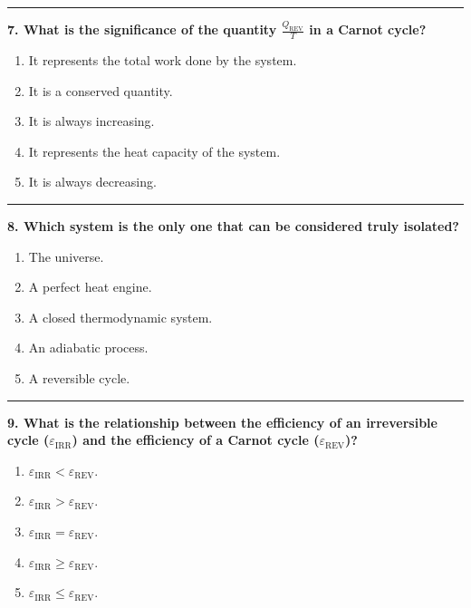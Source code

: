\documentclass[
  9pt,
]{extbook}
\providecommand{\tightlist}{%
  \setlength{\itemsep}{0pt}\setlength{\parskip}{0pt}}
\theoremstyle{definition}
\theoremstyle{definition}
\theoremstyle{definition}
\theoremstyle{remark}
\begin{document}
\begin{center}\rule{0.5\linewidth}{0.5pt}\end{center}

\textbf{7. What is the significance of the quantity \(\frac{Q_{\text{REV}}}{T}\) in a Carnot cycle?}

\begin{enumerate}
\def\labelenumi{\alph{enumi}.}
\tightlist
\item
  It represents the total work done by the system.
\item
  It is a conserved quantity.
\item
  It is always increasing.
\item
  It represents the heat capacity of the system.
\item
  It is always decreasing.
\end{enumerate}

\begin{center}\rule{0.5\linewidth}{0.5pt}\end{center}

\textbf{8. Which system is the only one that can be considered truly isolated?}

\begin{enumerate}
\def\labelenumi{\alph{enumi}.}
\tightlist
\item
  The universe.
\item
  A perfect heat engine.
\item
  A closed thermodynamic system.
\item
  An adiabatic process.
\item
  A reversible cycle.
\end{enumerate}

\begin{center}\rule{0.5\linewidth}{0.5pt}\end{center}

\textbf{9. What is the relationship between the efficiency of an irreversible cycle (\(\varepsilon_{\text{IRR}}\)) and the efficiency of a Carnot cycle (\(\varepsilon_{\text{REV}}\))?}

\begin{enumerate}
\def\labelenumi{\alph{enumi}.}
\tightlist
\item
  \(\varepsilon_{\text{IRR}} < \varepsilon_{\text{REV}}\).
\item
  \(\varepsilon_{\text{IRR}} > \varepsilon_{\text{REV}}\).
\item
  \(\varepsilon_{\text{IRR}} = \varepsilon_{\text{REV}}\).
\item
  \(\varepsilon_{\text{IRR}} \geq \varepsilon_{\text{REV}}\).
\item
  \(\varepsilon_{\text{IRR}} \leq \varepsilon_{\text{REV}}\).
\end{enumerate}
\end{document}
